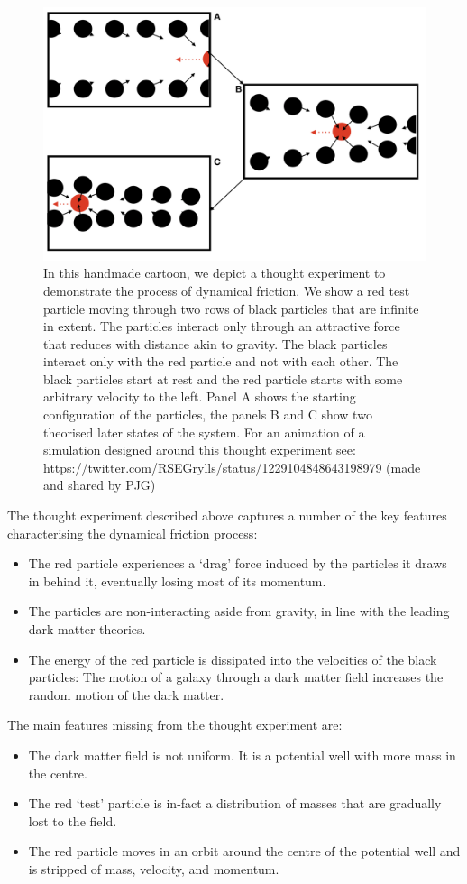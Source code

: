 \begin{figure}[h!]
    \centering
    \includegraphics[width = \linewidth]{Figures/Chapter2/Dynamical_Friction.png}
    \caption{In this handmade cartoon, we depict a thought experiment to demonstrate the process of dynamical friction. We show a red test particle moving through two rows of black particles that are infinite in extent. The particles interact only through an attractive force that reduces with distance akin to gravity. The black particles interact only with the red particle and not with each other. The black particles start at rest and the red particle starts with some arbitrary velocity to the left. Panel A shows the starting configuration of the particles, the panels B and C show two theorised later states of the system. For an animation of a simulation designed around this thought experiment see: \url{https://twitter.com/RSEGrylls/status/1229104848643198979} (made and shared by PJG)}
    \label{fig:Tdyn_toon}
\end{figure}

The thought experiment described above captures a number of the key features characterising the dynamical friction process: 
\begin{itemize}
    \item The red particle experiences a `drag' force induced by the particles it draws in behind it, eventually losing most of its momentum.
    \item The particles are non-interacting aside from gravity, in line with the leading dark matter theories.
    \item The energy of the red particle is dissipated into the velocities of the black particles: The motion of a galaxy through a dark matter field increases the random motion of the dark matter.
\end{itemize}
The main features missing from the thought experiment are:
\begin{itemize}
    \item The dark matter field is not uniform. It is a 
    potential well with more mass in the centre.
    \item The red `test' particle is in-fact a distribution of masses that are gradually lost to the field.
    \item The red particle moves in an orbit around the centre of the potential well and is stripped of mass, velocity, and momentum.
\end{itemize}

